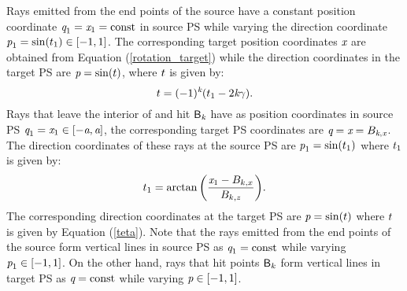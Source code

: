 Rays emitted from the end points of the source have a constant position coordinate $\textit{q}_1 = \textit{x}_1 = \textrm{const}$ in source PS while varying the direction coordinate $\textit{p}_1 = \sin(t_1)\in[-1, 1]$. The corresponding target position coordinates $\textit{x}$ are obtained from Equation (\ref{rotation_target}) while the direction coordinates in the target PS are $\textit{p} = \sin(t)$, where $t$ is given by: 
\begin{equation}\label{teta}
t=(-1)^{\textit{k}}(t_1-2\textit{k}\gamma).
\end{equation}
Rays that leave the interior of  and hit $\textsf{B}_{\textit{k}}$ have as position coordinates in source PS $\textit{q}_1 = \textit{x}_1\in[-\textit{a}, \textit{a}]$, the corresponding target PS coordinates are $\textit{q} = \textit{x} = B_{\textit{k}, \textit{x}}$.
The direction coordinates of these rays at the source PS are $\textit{p}_1 = \sin(t_1)$ where $t_1$ is given by:
\begin{equation}\label{anglesource}
t_1 = \arctan\bigg(\frac{\textit{x}_1-B_{k,x}}{B_{k,z}}\bigg).
\end{equation}
The corresponding direction coordinates at the target PS are $\textit{p}=\sin(t)$ where $t$ is given by Equation (\ref{teta}).
Note that the rays emitted from the end points of the source form vertical lines in source PS as $\textit{q}_1= \textrm{const}$ while varying $\textit{p}_1\in[-1,1]$.
On the other hand, rays that hit points $\textsf{B}_k$ form vertical lines in target PS as $\textit{q} = \textrm{const}$ while varying $\textit{p}\in[-1,1]$.
\\ \indent 
